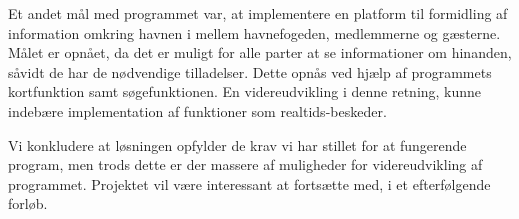 Et andet mål med programmet var, at implementere en platform til formidling af information omkring havnen i mellem havnefogeden, medlemmerne og gæsterne. Målet er opnået, da det er muligt for alle parter at se informationer om hinanden, såvidt de har de nødvendige tilladelser. Dette opnås ved hjælp af programmets kortfunktion samt søgefunktionen. En videreudvikling i denne retning, kunne indebære implementation af funktioner som realtids-beskeder.

Vi konkludere at løsningen opfylder de krav vi har stillet for at fungerende program, men trods dette er der massere af muligheder for videreudvikling af programmet. Projektet vil være interessant at fortsætte med, i et efterfølgende forløb. 